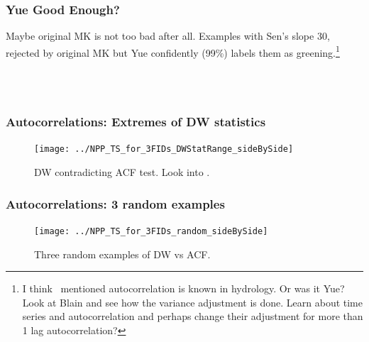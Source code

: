 \documentclass[serif, xcolor={dvipsnames}]{beamer} %
\begin{document}
\begin{frame}[t]
\vspace{-0.2in}
\frametitle{Yue Good Enough?}
{\small Maybe original MK is not too bad after all.
Examples with Sen's slope 30, 
rejected by original MK but Yue confidently (99\%) labels them as greening.{\footnote{\tiny I think~\cite{blain2013modified} mentioned autocorrelation is known in hydrology. Or was it Yue? Look at Blain and see how the variance adjustment is done. Learn about time series and autocorrelation and perhaps change their adjustment for more than 1 lag autocorrelation?
}}}
\begin{figure}[H] %
\centering
\captionsetup{singlelinecheck=false}
\\
\\
\end{figure}
\end{frame}
\begin{frame}[t]
\frametitle{Autocorrelations: Extremes of DW statistics}
\vspace{-.2in}
\begin{figure}[H]
\centering
\texttt{[image: ../NPP\_TS\_for\_3FIDs\_DWStatRange\_sideBySide]}
\captionsetup{singlelinecheck=false} 
\caption*{DW contradicting ACF test. Look into \color{red}{Ljung-Box Q test}.}
\label{fig:NPP_TS_for_3FIDs_DWStatRange_sideBySide}
\end{figure}
\end{frame}
\begin{frame}[t]
\frametitle{Autocorrelations: 3 random examples}
\vspace{-.2in}
\begin{figure}[H]
\centering
\texttt{[image: ../NPP\_TS\_for\_3FIDs\_random\_sideBySide]}
\captionsetup{singlelinecheck=false} 
\caption*{Three random examples of DW vs ACF.}
\label{fig:NPP_TS_for_3FIDs_random_sideBySide}
\end{figure}
\end{frame}
\end{document}
